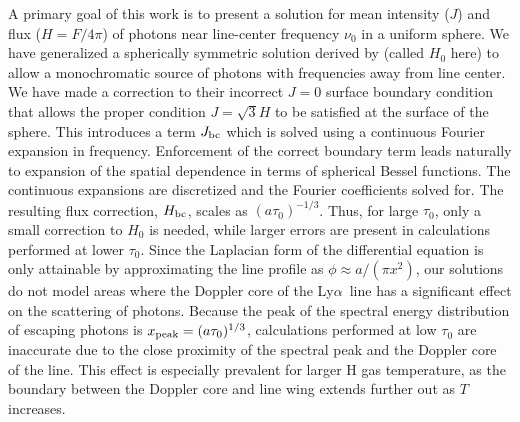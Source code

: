 \documentclass{aastex63}
\newcommand\lya{Ly$\alpha$\ }
\begin{document}
A primary goal of this work is to present a solution for mean intensity ($J$) and flux ($H = F/4\pi$) of photons near line-center frequency $\nu_0$ in a uniform sphere. We have generalized a spherically symmetric solution derived by \cite{2006ApJ...649...14D} (called $H_0$ here) to allow a monochromatic source of photons with frequencies away from line center. We have made a correction to their incorrect $J=0$ surface boundary condition that allows the proper condition $J=\sqrt{3}H$ to be satisfied at the surface of the sphere. This introduces a term $J_{\rm bc}$ which is solved using a continuous Fourier expansion in frequency. Enforcement of the correct boundary term leads naturally to expansion of the spatial dependence in terms of spherical Bessel functions. The continuous expansions are discretized and the Fourier coefficients solved for. The resulting flux correction, $H_{\rm bc}$, scales as $(a\tau_0)^{-1/3}$. Thus, for large $\tau_0$, only a small correction to $H_0$ is needed, while larger errors are present in calculations performed at lower $\tau_0$. Since the Laplacian form of the differential equation is only attainable by approximating the line profile as $\phi \approx a/(\pi x^2)$, our solutions do not model areas where the Doppler core of the \lya line has a significant effect on the scattering of photons. Because the peak of the spectral energy distribution of escaping photons is $x_{\rm peak} = (a\tau_0)^{1/3}$, calculations performed at low $\tau_0$ are inaccurate due to the close proximity of the spectral peak and the Doppler core of the line. This effect is especially prevalent for larger H gas temperature, as the boundary between the Doppler core and line wing extends further out as $T$ increases.
\end{document}
